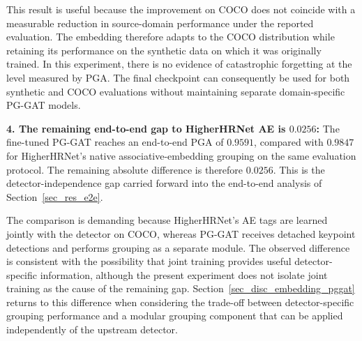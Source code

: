 This result is useful because the improvement on COCO does not coincide
with a measurable reduction in source-domain performance under the
reported evaluation.
The embedding therefore adapts to the COCO distribution while retaining
its performance on the synthetic data on which it was originally trained.
In this experiment, there is no evidence of catastrophic forgetting
at the level measured by PGA.
The final checkpoint can consequently be used for both synthetic and
COCO evaluations without maintaining separate domain-specific PG-GAT
models.

\textbf{4. The remaining end-to-end gap to HigherHRNet AE is
$0.0256$:}
The fine-tuned PG-GAT reaches an end-to-end PGA of $0.9591$,
compared with $0.9847$ for HigherHRNet's native associative-embedding
grouping on the same evaluation protocol.
The remaining absolute difference is therefore $0.0256$.
This is the detector-independence gap carried forward into the
end-to-end analysis of Section~\ref{sec_res_e2e}.

The comparison is demanding because HigherHRNet's AE tags are learned
jointly with the detector on COCO,
whereas PG-GAT receives detached keypoint detections and performs
grouping as a separate module.
The observed difference is consistent with the possibility that joint
training provides useful detector-specific information,
although the present experiment does not isolate joint training
as the cause of the remaining gap.
Section~\ref{sec_disc_embedding_pggat} returns to this difference
when considering the trade-off between detector-specific grouping
performance and a modular grouping component that can be applied
independently of the upstream detector.